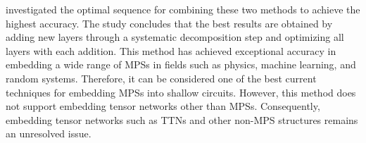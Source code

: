 \documentclass[12pt,dvipdfmx,twoside,openright]{report}
\begin{document}
\cite{mpsdecomp} investigated the optimal sequence for combining these two methods to achieve the highest accuracy.
The study concludes that the best results are obtained by adding new layers through a systematic decomposition step and optimizing all layers with each addition.
This method has achieved exceptional accuracy in embedding a wide range of MPSs in fields such as physics, machine learning, and random systems.
Therefore, it can be considered one of the best current techniques for embedding MPSs into shallow circuits.
However, this method does not support embedding tensor networks other than MPSs.
Consequently, embedding tensor networks such as TTNs and other non-MPS structures remains an unresolved issue.















\end{document}
